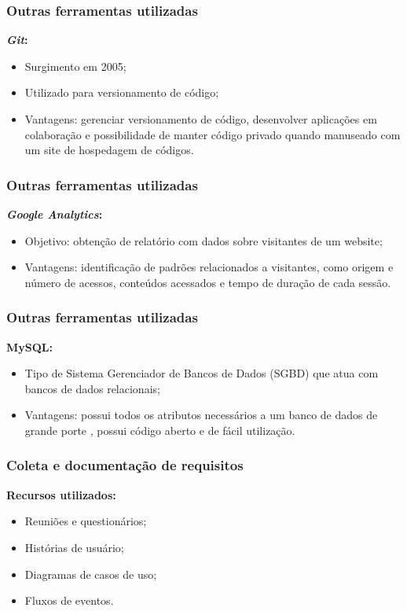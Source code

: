 \documentclass{beamer}
\begin{document}
\begin{frame}
    \frametitle{Outras ferramentas utilizadas}
    \textbf{\textit{Git}:} 
    \begin{itemize}
        \item Surgimento em 2005;
        \item Utilizado para versionamento de código; %
        \item Vantagens: gerenciar versionamento de código, desenvolver aplicações em colaboração e possibilidade de manter código privado quando manuseado com um site de hospedagem de códigos.
    \end{itemize}
\end{frame}


\begin{frame}
    \frametitle{Outras ferramentas utilizadas}
    \textbf{\textit{Google Analytics}:} 
    \begin{itemize}
        \item Objetivo: obtenção de relatório com dados sobre visitantes de um website;
        \item Vantagens: identificação de padrões relacionados a visitantes, como origem e número de acessos, conteúdos acessados e tempo de duração de cada sessão. %
    \end{itemize}
\end{frame}


\begin{frame}
    \frametitle{Outras ferramentas utilizadas}
    \textbf{MySQL:} 
    \begin{itemize}
        \item Tipo de Sistema Gerenciador de Bancos de Dados (SGBD) que atua com bancos de dados relacionais; %
        \item Vantagens: possui todos os atributos necessários a um banco de dados de grande porte \cite{milani2007mysql}, possui código aberto e de fácil utilização. 
    \end{itemize}
    
\end{frame}



\begin{frame}
    \frametitle{Coleta e documentação de requisitos}
    \textbf{Recursos utilizados:}
    \begin{itemize}
        \item Reuniões e questionários;
        \item Histórias de usuário;
        \item Diagramas de casos de uso;
        \item Fluxos de eventos.
    \end{itemize}
\end{frame}
\end{document}
